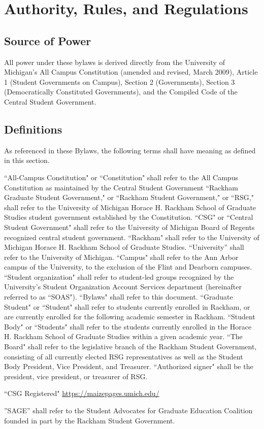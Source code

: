 \chapter{Authority, Rules, and Regulations}
\section{Source of Power} All power under these bylaws is derived directly from the University of Michigan's All Campus Constitution (amended and revised, March 2009), Article 1 (Student Governments on Campus), Section 2 (Governments), Section 3 (Democratically Constituted Governments), and the Compiled Code of the Central Student Government.

\section{Definitions} As referenced in these Bylaws, the following terms shall have meaning as defined in this section.
\begin{enumsubsection}
\itemnotoc ``All-Campus Constitution" or ``Constitution" shall refer to the All Campus Constitution as maintained by the Central Student Government 
\itemnotoc ``Rackham Graduate Student Government," or ``Rackham Student Government," or ``RSG," shall refer to the University of Michigan Horace 
H. Rackham School of Graduate Studies student government established by the Constitution. 
\itemnotoc ``CSG" or ``Central Student Government" shall refer to the University of Michigan Board of Regents recognized central student government. 
\itemnotoc ``Rackham" shall refer to the University of Michigan Horace H. Rackham School of Graduate Studies. 
\itemnotoc ``University'' shall refer to the University of Michigan. 
\itemnotoc ``Campus" shall refer to the Ann Arbor campus of the University, to the exclusion of the Flint and Dearborn campuses. 
\itemnotoc ``Student organization" shall refer to student-led groups recognized by the University's Student Organization Account Services department (hereinafter referred to as ``SOAS").
\itemnotoc ``Bylaws" shall refer to this document. 
\itemnotoc ``Graduate Student" or ``Student" shall refer to students currently enrolled in Rackham, or are currently enrolled for the following academic semester in Rackham. 
\itemnotoc ``Student Body" or ``Students" shall refer to the students currently enrolled in the Horace H. Rackham School of Graduate Studies within a given 
academic year.
\itemnotoc ``The Board" shall refer to the legislative branch of the Rackham Student Government, consisting of all currently elected RSG representatives as well as the Student Body President, Vice President, and Treasurer.
\itemnotoc ``Authorized signer" shall be the president, vice president, or treasurer of RSG. 

\itemnotoc ``CSG Registered" \url{https://maizepages.umich.edu/}

\itemnotoc ''SAGE'' shall refer to the Student Advocates for Graduate  Education Coalition founded in part by the Rackham Student Government. 
\end{enumsubsection}

